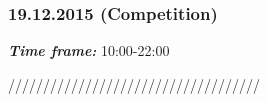 \subsubsection{19.12.2015 (Competition)}
\textit{\textbf{Time frame:}} 10:00-22:00

////////////////////////////////////

